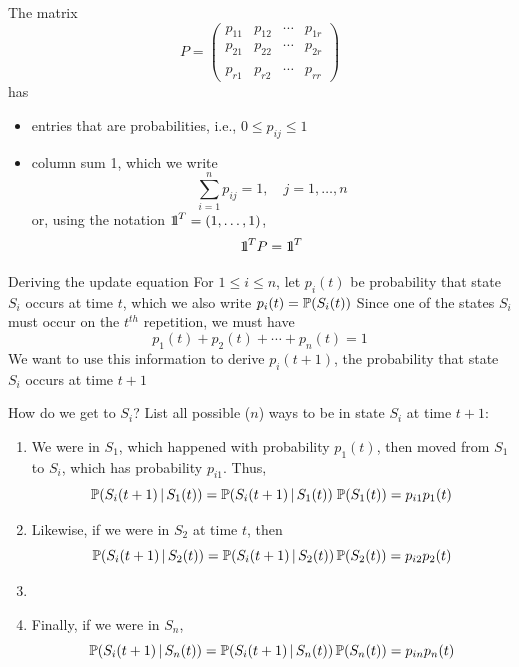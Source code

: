 \documentclass[aspectratio=169]{beamer}\usepackage[]{graphicx}\usepackage[]{xcolor}
\begin{document}
\begin{frame} 
The matrix 
\[
P=
\begin{pmatrix}
p_{11} & p_{12} & \cdots & p_{1r} \\
p_{21} & p_{22} & \cdots & p_{2r} \\
&&& \\
p_{r1} & p_{r2} & \cdots & p_{rr}
\end{pmatrix}
\]
has
\begin{itemize}
\item entries that are probabilities, i.e., $0\leq p_{ij}\leq 1$
\item column sum 1, which we write
\[
\sum_{i=1}^n p_{ij}=1,\quad j=1,\ldots,n
\]
or, using the notation $\nbOne^T=(1,\ldots,1)$,
\[
\nbOne^TP=\nbOne^T
\]
\end{itemize}
\end{frame}



\begin{frame}{Deriving the update equation}
For $1\leq i\leq n$, let $p_i(t)$ be probability that state $S_i$ occurs at time $t$, which we also write $p_i(t)=\mathbb{P}(S_i(t))$
\vfill
Since one of the states $S_i$ must occur on the $t^{th}$ repetition, we must have
\[
p_1(t)+p_2(t)+\cdots+p_n(t)=1
\]
\vfill
We want to use this information to derive $p_i(t+1)$, the probability that state $S_i$ occurs at time $t+1$
\
\end{frame}

\begin{frame}{How do we get to $S_i$?}
List all possible ($n$) ways to be in state $S_i$ at time $t+1$:
\vfill
\begin{enumerate}
\item We were in $S_1$, which happened with probability $p_1(t)$, then moved from $S_1$ to $S_i$, which has probability $p_{i1}$. Thus, 
\[
\mathbb{P}(S_i(t+1)\,|\, S_1(t)) = 
\mathbb{P}(S_i(t+1)\,|\,S_1(t)) \; \mathbb{P}(S_1(t)) = 
p_{i1}p_1(t)
\]
\vfill
\item Likewise, if we were in $S_2$ at time $t$, then
\[
\mathbb{P}(S_i(t+1)\,|\, S_2(t)) = 
\mathbb{P}(S_i(t+1)\,|\,S_2(t))\,\mathbb{P}(S_2(t)) =
p_{i2}p_2(t)
\]
\vfill
\item[..]\mbox{}
\vfill
\item[n.] Finally, if we were in $S_n$,
\[
\mathbb{P}(S_i(t+1)\,|\, S_n(t)) = 
\mathbb{P}(S_i(t+1)\,|\,S_n(t))\,\mathbb{P}(S_n(t)) =
p_{in}p_n(t)
\]
\end{enumerate}
\end{frame}
\end{document}
